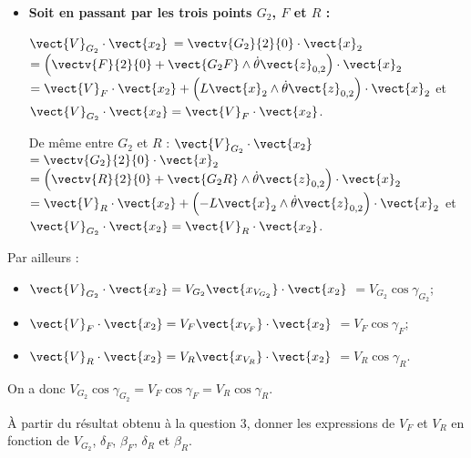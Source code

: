 \documentclass[11pt]{article}
\begin{document}
\begin{UPSTIcorrige}
{\begin{itemize}
On a donc $\vect{V}_{G_2}\cdot\vect{x_2}$ $=\vect{V}_{F}\cdot\vect{x_2}=\vect{V}_{R}\cdot\vect{x_2} = \rho\dot{\theta}$.

\item \textbf{Soit en passant par les trois points $G_2$, $F$ et $R$ :}

$\vect{V}_{G_2}\cdot\vect{x_2} $ $=\vectv{G_2}{2}{0}\cdot \vect{x}_2$ $=\left(\vectv{F}{2}{0}+\vect{G_2F}\wedge \dot{\theta}\vect{z}_{0,2}\right)\cdot \vect{x}_2$ $=\vect{V}_{F}\cdot\vect{x_2}+\left(L\vect{x}_2\wedge \dot{\theta}\vect{z}_{0,2}\right)\cdot \vect{x}_2$ et $\vect{V}_{G_2}\cdot\vect{x_2}=\vect{V}_{F}\cdot\vect{x_2}$.

De même entre $G_2$ et $R$ : 
$\vect{V}_{G_2}\cdot\vect{x_2}$  $=\vectv{G_2}{2}{0}\cdot \vect{x}_2$ $=\left(\vectv{R}{2}{0}+\vect{G_2R}\wedge \dot{\theta}\vect{z}_{0,2}\right)\cdot \vect{x}_2$ $=\vect{V}_{R}\cdot\vect{x_2}+\left(-L\vect{x}_2\wedge \dot{\theta}\vect{z}_{0,2}\right)\cdot \vect{x}_2$ et $\vect{V}_{G_2}\cdot\vect{x_2}=\vect{V}_{R}\cdot\vect{x_2}$.

\end{itemize}

Par ailleurs : 
\begin{itemize}
\item $\vect{V}_{G_2}\cdot\vect{x_2} = V_{G_2} \vect{x_{V_{G_2}}} \cdot\vect{x_2}$ $=V_{G_2} \cos \gamma_{G_2}$;
\item $\vect{V}_{F}\cdot\vect{x_2}={V}_{F}\vect{x_{V_F}}\cdot\vect{x_2}$  $=V_{F} \cos \gamma_{F}$;
\item $\vect{V}_{R}\cdot\vect{x_2}={V}_{R}\vect{x_{V_R}}\cdot\vect{x_2}$   $=V_{R} \cos \gamma_{R}$.
\end{itemize}

On a donc  $V_{G_2} \cos \gamma_{G_2}=V_{F} \cos \gamma_{F}=V_{R} \cos \gamma_{R}$.
}

\normalsize

\end{UPSTIcorrige}



\UPSTIquestion À partir du résultat obtenu à la question 3, donner les expressions de $V_F$ et $V_R$ en fonction de $V_{G_2}$, $\delta_F$, $\beta_F$, $\delta_R$ et $\beta_R$. 
\end{document}
